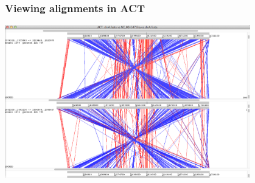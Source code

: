 \documentclass[table]{beamer}
\begin{document}
    \begin{frame}
      \frametitle{Viewing alignments in ACT}    
      \begin{center}
        \includegraphics[width=0.8\textwidth]{images/act_wgs10}     
      \end{center}
    \end{frame} 
\end{document}
